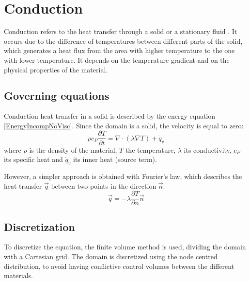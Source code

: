 \chapter{Conduction}
Conduction refers to the heat transfer through a solid or a stationary fluid \cite{Bergman2011}. It occurs due to the difference of temperatures between different parts of the solid, which generates a heat flux from the area with higher temperature to the one with lower temperature. It depends on the temperature gradient and on the physical properties of the material.

\section{Governing equations}
Conduction heat transfer in a solid is described by the energy equation \ref{EnergyIncompNoVisc}. Since the domain is a solid, the velocity is equal to zero:
\begin{equation}
\rho c_{P}\frac{\partial T}{\partial t}=\nabla\cdot\left(\lambda\nabla T\right)+\dot{q}_{v}
\label{condu}
\end{equation}
where $\rho$ is the density of the material, $T$ the temperature, $\lambda$ its conductivity, $c_{P}$ its specific heat and $\dot{q}_{v}$ its inner heat (source term).

However, a simpler approach is obtained with Fourier's law, which describes the heat transfer $\vec{q}$ between two points in the direction $\vec{n}$:
\begin{equation}
\vec{q}=-\lambda\frac{\partial T}{\partial n}\vec{n}
\label{Fourier}
\end{equation}

\section{Discretization}
To discretize the equation, the finite volume method is used, dividing the domain with a Cartesian grid. The domain is discretized using the node centred distribution, to avoid having conflictive control volumes between the different materials.

